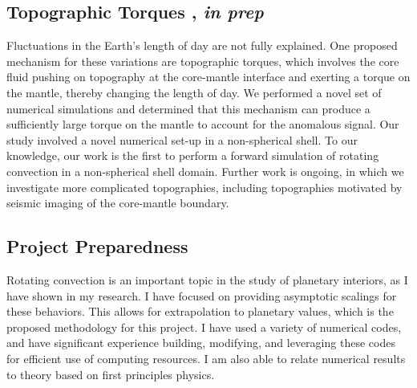 \documentclass[12pt]{article}
\begin{document}
\subsection*{Topographic Torques \cite{tO25}, \textit{in prep}}
Fluctuations in the Earth's length of day are not fully explained.
One proposed mechanism for these variations are topographic torques, which involves the core fluid pushing on topography at the core-mantle interface and exerting a torque on the mantle, thereby changing the length of day. We performed a novel set of numerical simulations and determined that this mechanism can produce a sufficiently large torque on the mantle to account for the anomalous signal. Our study involved a novel numerical set-up in a non-spherical shell. To our knowledge, our work is the first to perform a forward simulation of rotating convection in a non-spherical shell domain. Further work is ongoing, in which we investigate more complicated topographies, including topographies motivated by seismic imaging of the core-mantle boundary.
\subsection*{Project Preparedness}
Rotating convection is an important topic in the study of planetary interiors, as I have shown in my research. I have focused on providing asymptotic scalings for these behaviors. This allows for extrapolation to planetary values, which is the proposed methodology for this project. I have used a variety of numerical codes, and have significant experience building, modifying, and leveraging these codes for efficient use of computing resources. I am also able to relate numerical results to theory based on first principles physics.
\printbibliography
\end{document}
